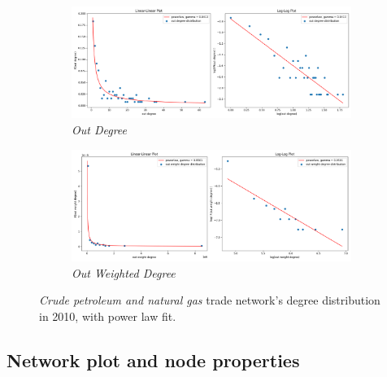 \begin{figure}
    \centering
    \begin{subfigure}{\textwidth}
        \centering
        \includegraphics[width=\textwidth]{pics/powerlaw_out_degree_p06_y2010.png}
        \caption{\textit{Out Degree}}
        \label{fig:plgas}
    \end{subfigure}
    
    \begin{subfigure}{\textwidth}
        \centering
        \includegraphics[width=\textwidth]{pics/powerlaw_out_weight_degree_p06_y2010.png}
        \caption{\textit{Out Weighted Degree}}
        \label{fig:plgasw}
    \end{subfigure}
    \caption{\textit{Crude petroleum and natural gas} trade network's degree distribution in 2010, with power law fit.}
    \label{fig:gasdistrib}
\end{figure}


\subsection{Network plot and node properties}

